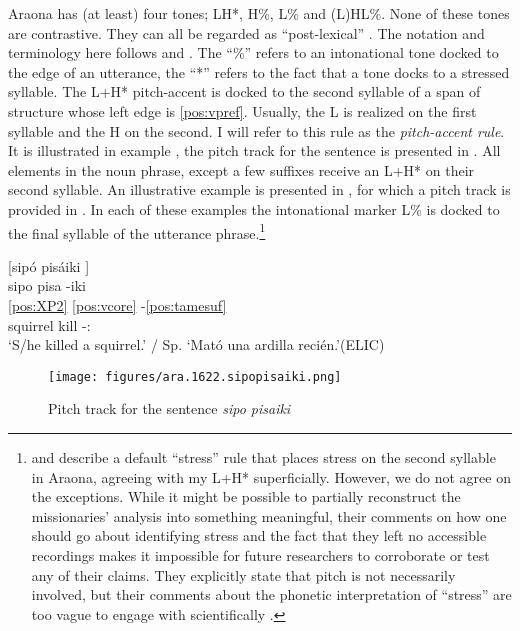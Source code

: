 \documentclass[output=paper,hidelinks]{langscibook}
\begin{document}
Araona has (at least) four tones; LH*, H\%, L\% and (L)HL\%. None of these tones are contrastive. They can all be regarded as ``post-lexical'' \citep{ladd2008}. The notation and terminology here follows \citet{pierrehumbertbeckman:1986} and \citet{gussenhovenbruce:1999}. The ``\%'' refers to an intonational tone docked to the edge of an utterance, the ``*'' refers to the fact that a tone docks to a stressed syllable. The L+H* pitch-accent is docked to the second syllable of a span of structure whose left edge is \ref{pos:vpref}. Usually, the L is realized on the first syllable and the H on the second. I will refer to this rule as the \textit{pitch-accent rule}. It is illustrated in example , the pitch track for the sentence is presented in . All elements in the noun phrase, except a few suffixes receive an L+H* on their second syllable. An illustrative example is presented in , for which a pitch track is provided in . In each of these examples the intonational marker L\% is docked to the final syllable of the utterance phrase.\footnote{\citet{pitmanpitman1976} and \citet{pitman:1980:araonasketch} describe a default ``stress'' rule that places stress on the second syllable in Araona, agreeing with my L+H* superficially. However, we do not agree on the exceptions. While it might be possible to partially reconstruct the missionaries' analysis into something meaningful, their comments on how one should go about identifying stress and the fact that they left no accessible recordings makes it impossible for future researchers to corroborate or test any of their claims. They explicitly state that pitch is not necessarily involved, but their comments about the phonetic interpretation of ``stress'' are too vague to engage with scientifically \citep[10]{pitmanpitman1976}.}

\ea \label{ex:pisa.LH}
	[sipó pisáiki \downarrow] \\	
	\glll sipo pisa -iki \\
	\ref{pos:XP2} \ref{pos:vcore} -\ref{pos:tamesuf} \\
	squirrel kill -\Recp{}:\Pst{}  \\
	\glt `S/he killed a squirrel.' / Sp. `Mató una ardilla recién.'\hfill (ELIC)
\z

\begin{figure}
    \texttt{[image: figures/ara.1622.sipopisaiki.png]}
    \caption{Pitch track for the sentence \textit{sipo pisaiki}}
    \label{fig:pitchtracksipopisaiki}
\end{figure}
\end{document}

